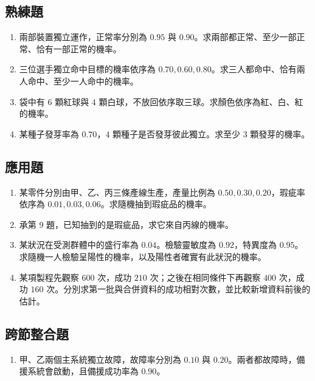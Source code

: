 \documentclass[11pt,a4paper]{article}
\providecommand{\tightlist}{%
  \setlength{\itemsep}{0pt}\setlength{\parskip}{0pt}}
\begin{document}
\subsection{熟練題}\label{ux719fux7df4ux984c}

\begin{enumerate}
\def\labelenumi{\arabic{enumi}.}
\setcounter{enumi}{4}
\item
  兩部裝置獨立運作，正常率分別為 \(0.95\) 與 \(0.90\)。求兩部都正常、至少一部正常、恰有一部正常的機率。
\item
  三位選手獨立命中目標的機率依序為 \(0.70,0.60,0.80\)。求三人都命中、恰有兩人命中、至少一人命中的機率。
\item
  袋中有 \(6\) 顆紅球與 \(4\) 顆白球，不放回依序取三球。求顏色依序為紅、白、紅的機率。
\item
  某種子發芽率為 \(0.70\)，\(4\) 顆種子是否發芽彼此獨立。求至少 \(3\) 顆發芽的機率。
\end{enumerate}

\subsection{應用題}\label{ux61c9ux7528ux984c}

\begin{enumerate}
\def\labelenumi{\arabic{enumi}.}
\setcounter{enumi}{8}
\item
  某零件分別由甲、乙、丙三條產線生產，產量比例為 \(0.50,0.30,0.20\)，瑕疵率依序為 \(0.01,0.03,0.06\)。求隨機抽到瑕疵品的機率。
\item
  承第 9 題，已知抽到的是瑕疵品，求它來自丙線的機率。
\item
  某狀況在受測群體中的盛行率為 \(0.04\)。檢驗靈敏度為 \(0.92\)，特異度為 \(0.95\)。求隨機一人檢驗呈陽性的機率，以及陽性者確實有此狀況的機率。
\item
  某項製程先觀察 \(600\) 次，成功 \(210\) 次；之後在相同條件下再觀察 \(400\) 次，成功 \(160\) 次。分別求第一批與合併資料的成功相對次數，並比較新增資料前後的估計。
\end{enumerate}

\subsection{跨節整合題}\label{ux8de8ux7bc0ux6574ux5408ux984c}

\begin{enumerate}
\def\labelenumi{\arabic{enumi}.}
\setcounter{enumi}{12}
\tightlist
\item
  甲、乙兩個主系統獨立故障，故障率分別為 \(0.10\) 與 \(0.20\)。兩者都故障時，備援系統會啟動，且備援成功率為 \(0.90\)。
\end{enumerate}
\end{document}
